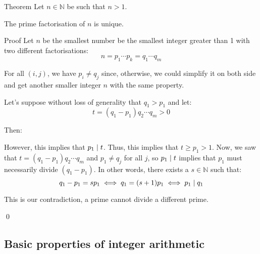 \documentclass[a4paper]{article}
\begin{document}
\begin{parag}{Theorem}
    Let $n \in \mathbb{N}$ be such that $n > 1$. 

    The prime factorisation of $n$ is unique.

    \begin{subparag}{Proof}
        Let $n$ be the smallest number be the smallest integer greater than 1 with two different factorisations: 
        \[n = p_1 \cdots p_k = q_1 \cdots q_m\]
        
        For all $\left(i, j\right)$, we have $p_i \neq q_j$ since, otherwise, we could simplify it on both side and get another smaller integer $n$ with the same property. 

        Let's suppose without loss of generality that $q_1 > p_1$ and let:
        \[t = \left(q_1 - p_1\right)q_2 \cdots q_m > 0\]

        Then: 
        
        However, this implies that $p_1 \mid t$. Thus, this implies that $t \geq p_1 > 1$. Now, we saw that $t = \left(q_1 - p_1\right)q_2 \cdots q_m$ and $p_1 \neq q_j$ for all $j$, so $p_1 \mid t$ implies that $p_1$ must necessarily divide $\left(q_1 - p_1\right)$. In other words, there exists a $s \in \mathbb{N}$ such that: 
        \[q_1 - p_1 = sp_1 \iff q_1 = \left(s+1\right)p_1 \iff p_1 \divides q_1\]

        This is our contradiction, a prime cannot divide a different prime.

        \qed
    \end{subparag}
\end{parag}

\subsection{Basic properties of integer arithmetic}
\end{document}
